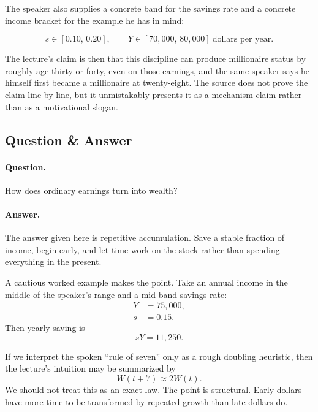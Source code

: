 The speaker also supplies a concrete band for the savings rate and a concrete income bracket for the example he has in mind:

\begin{equation}
s \in [0.10,\,0.20],
\qquad
Y \in [70{,}000,\,80{,}000]\ \text{dollars per year}.
\end{equation}

The lecture's claim is then that this discipline can produce millionaire status by roughly age thirty or forty, even on those earnings, and the same speaker says he himself first became a millionaire at twenty-eight. The source does not prove the claim line by line, but it unmistakably presents it as a mechanism claim rather than as a motivational slogan.

\subsection{Question \& Answer}

\paragraph{Question.} How does ordinary earnings turn into wealth?

\paragraph{Answer.} The answer given here is repetitive accumulation. Save a stable fraction of income, begin early, and let time work on the stock rather than spending everything in the present.

A cautious worked example makes the point. Take an annual income in the middle of the speaker's range and a mid-band savings rate:
\begin{align}
Y &= 75{,}000,\\
s &= 0.15.
\end{align}
Then yearly saving is
\begin{equation}
sY = 11{,}250.
\end{equation}

If we interpret the spoken ``rule of seven'' only as a rough doubling heuristic, then the lecture's intuition may be summarized by
\begin{equation}
W(t+7) \approx 2W(t).
\end{equation}
We should not treat this as an exact law. The point is structural. Early dollars have more time to be transformed by repeated growth than late dollars do.

